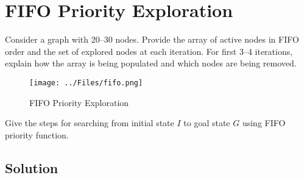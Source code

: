 \section*{FIFO Priority Exploration}

Consider a graph with 20--30 nodes.
Provide the array of active nodes in FIFO order and the set of explored nodes at each iteration.
For first 3--4 iterations, explain how the array is being populated and which nodes are being removed.

\begin{figure}[htbp]
      \centering
      \texttt{[image: ../Files/fifo.png]}
      \vspace*{-2em}
      \caption{
            FIFO Priority Exploration
      }\label{fig:q1}
\end{figure}

Give the steps for searching from initial state \(I\) to  goal state \(G\) using FIFO priority function.

\subsection*{Solution}

